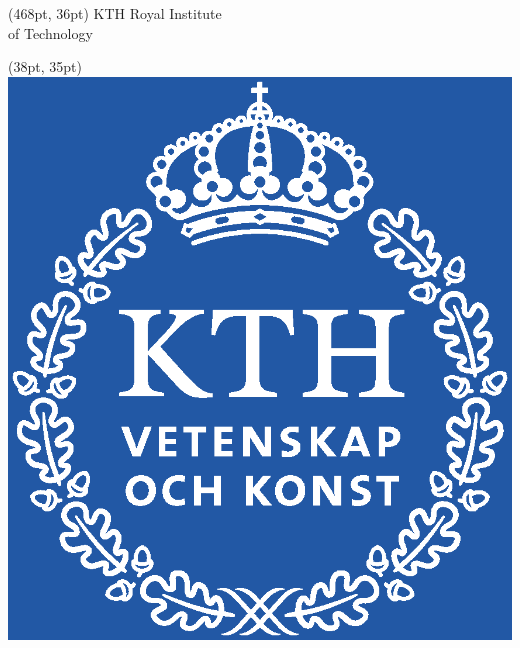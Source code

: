 \makeatletter
\begin{titlepage}
    
    \thispagestyle{empty}
    \begin{textblock*}{120pt}(468pt, 36pt) %
    \colvillebold \small KTH Royal Institute \\of Technology
    \end{textblock*}
    
    \begin{textblock*}{72.85pt}(38pt, 35pt) %
    \includegraphics[width=0.12\paperwidth]{setup/img/kth_logo.eps}
    \end{textblock*}
     

\end{titlepage}
